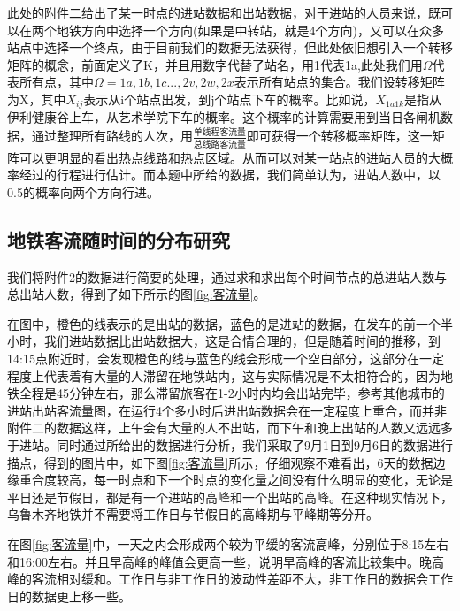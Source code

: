 \documentclass[12pt,a4paper]{mcmthesis}
\begin{document}
    此处的附件二给出了某一时点的进站数据和出站数据，对于进站的人员来说，既可以在两个地铁方向中选择一个方向(如果是中转站，就是4个方向)，又可以在众多站点中选择一个终点，由于目前我们的数据无法获得，但此处依旧想引入一个转移矩阵的概念，前面定义了K，并且用数字代替了站名，用1代表1a,此处我们用$\Omega$代表所有点，其中$\Omega={1a,1b,1c...,2v,2w,2x}$表示所有站点的集合。我们设转移矩阵为X，其中$X_{ij}$表示从i个站点出发，到j个站点下车的概率。比如说，$X_{1a1k}$是指从伊利健康谷上车，从艺术学院下车的概率。这个概率的计算需要用到当日各闸机数据，通过整理所有路线的人次，用$\frac{单线程客流量}{总线路客流量}$即可获得一个转移概率矩阵，这一矩阵可以更明显的看出热点线路和热点区域。从而可以对某一站点的进站人员的大概率经过的行程进行估计。而本题中所给的数据，我们简单认为，进站人数中，以0.5的概率向两个方向行进。

    \subsection{地铁客流随时间的分布研究}

    我们将附件2的数据进行简要的处理，通过求和求出每个时间节点的总进站人数与总出站人数，得到了如下所示的图\ref{fig:客流量}。

    在图中，橙色的线表示的是出站的数据，蓝色的是进站的数据，在发车的前一个半小时，我们进站数据比出站数据大，这是合情合理的，但是随着时间的推移，到14:15点附近时，会发现橙色的线与蓝色的线会形成一个空白部分，这部分在一定程度上代表着有大量的人滞留在地铁站内，这与实际情况是不太相符合的，因为地铁全程是45分钟左右，那么滞留旅客在1-2小时内均会出站完毕，参考其他城市的进站出站客流量图，在运行4个多小时后进出站数据会在一定程度上重合，而并非附件二的数据这样，上午会有大量的人不出站，而下午和晚上出站的人数又远远多于进站。同时通过所给出的数据进行分析，我们采取了9月1日到9月6日的数据进行描点，得到的图片中，如下图\ref{fig:客流量}所示，仔细观察不难看出，6天的数据边缘重合度较高，每一时点和下一个时点的变化量之间没有什么明显的变化，无论是平日还是节假日，都是有一个进站的高峰和一个出站的高峰。在这种现实情况下，乌鲁木齐地铁并不需要将工作日与节假日的高峰期与平峰期等分开。

    在图\ref{fig:客流量}中，一天之内会形成两个较为平缓的客流高峰，分别位于8:15左右和16:00左右。并且早高峰的峰值会更高一些，说明早高峰的客流比较集中。晚高峰的客流相对缓和。工作日与非工作日的波动性差距不大，非工作日的数据会工作日的数据更上移一些。
\end{document}
